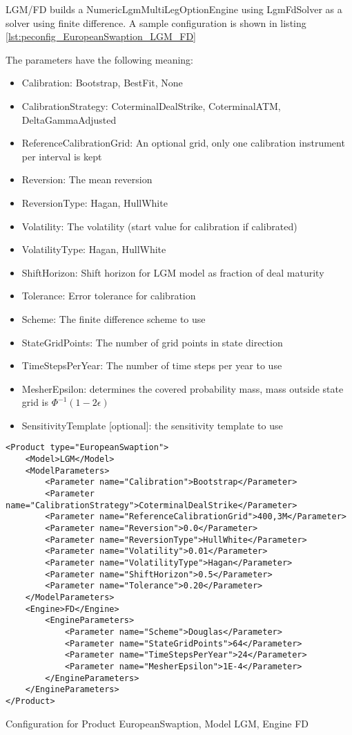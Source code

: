 LGM/FD builds a NumericLgmMultiLegOptionEngine using LgmFdSolver as a solver using finite difference. A sample
configuration is shown in listing \ref{lst:peconfig_EuropeanSwaption_LGM_FD}

The parameters have the following meaning:

\begin{itemize}
\item Calibration: Bootstrap, BestFit, None
\item CalibrationStrategy: CoterminalDealStrike, CoterminalATM, DeltaGammaAdjusted
\item ReferenceCalibrationGrid: An optional grid, only one calibration instrument per interval is kept
\item Reversion: The mean reversion
\item ReversionType: Hagan, HullWhite
\item Volatility: The volatility (start value for calibration if calibrated)
\item VolatilityType: Hagan, HullWhite
\item ShiftHorizon: Shift horizon for LGM model as fraction of deal maturity
\item Tolerance: Error tolerance for calibration
\item Scheme: The finite difference scheme to use
\item StateGridPoints: The number of grid points in state direction
\item TimeStepsPerYear: The number of time steps per year to use
\item MesherEpsilon: determines the covered probability mass, mass outside state grid is $\Phi^{-1}(1-2\epsilon)$
\item SensitivityTemplate [optional]: the sensitivity template to use 
\end{itemize}

\begin{longlisting}
\begin{verbatim}
<Product type="EuropeanSwaption">
    <Model>LGM</Model>
    <ModelParameters>
        <Parameter name="Calibration">Bootstrap</Parameter>
        <Parameter name="CalibrationStrategy">CoterminalDealStrike</Parameter>
        <Parameter name="ReferenceCalibrationGrid">400,3M</Parameter>
        <Parameter name="Reversion">0.0</Parameter>
        <Parameter name="ReversionType">HullWhite</Parameter>
        <Parameter name="Volatility">0.01</Parameter>
        <Parameter name="VolatilityType">Hagan</Parameter>
        <Parameter name="ShiftHorizon">0.5</Parameter>
        <Parameter name="Tolerance">0.20</Parameter>
    </ModelParameters>
    <Engine>FD</Engine>
        <EngineParameters>
            <Parameter name="Scheme">Douglas</Parameter>
            <Parameter name="StateGridPoints">64</Parameter>
            <Parameter name="TimeStepsPerYear">24</Parameter>
            <Parameter name="MesherEpsilon">1E-4</Parameter>
        </EngineParameters>
    </EngineParameters>
</Product>
\end{verbatim}
\caption{Configuration for Product EuropeanSwaption, Model LGM, Engine FD}
\label{lst:peconfig_EuropeanSwaption_LGM_FD}
\end{longlisting}


